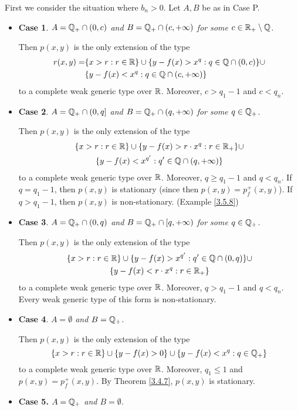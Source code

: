 \documentclass[11pt]{article}
\begin{document}
\begin{itemize}
First we consider the situation where \(b_n>0\). Let \(A,B\) be as in Case P.
\begin{itemize}
\item \textbf{Case 1}. \emph{\(A=\mathbb{Q}_+\cap(0,c)\) and \(B=\mathbb{Q}_+\cap(c,+\infty)\) for some \(c\in\mathbb{R}_+\setminus\mathbb{Q}\).}

Then \(p(x,y)\) is the only extension of the type
\begin{align*}
r(x,y)=&\{x>r:r\in\mathbb{R}\}\cup\{y-f(x)>x^q:q\in\mathbb{Q}\cap(0,c)\}\cup\\
&\{y-f(x)<x^q:q\in\mathbb{Q}\cap(c,+\infty)\}
\end{align*}
to a complete weak generic type over \(\mathbb{R}\). Moreover, \(c>q_1-1\) and \(c<q_n\).
\label{Problem8}
\item \textbf{Case 2}. \emph{\(A=\mathbb{Q}_+\cap(0,q]\) and \(B=\mathbb{Q}_+\cap(q,+\infty)\) for some \(q\in\mathbb{Q}_+\).}

Then \(p(x,y)\) is the only extension of the type
\begin{gather*}
\{x>r:r\in\mathbb{R}\}\cup\{y-f(x)>r\cdot x^q:r\in\mathbb{R}_+\}\cup\\
\{y-f(x)<x^{q'}:q'\in\mathbb{Q}\cap(q,+\infty)\}
\end{gather*}
to a complete weak generic type over \(\mathbb{R}\). Moreover, \(q\ge q_1-1\)
and \(q<q_n\).
If \(q=q_1-1\), then \(p(x,y)\) is stationary (since then \(p(x,y)=p_f^+(x,y)\)).
If \(q>q_1-1\), then \(p(x,y)\) is non-stationary. (Example \ref{3.5.8})
\item \textbf{Case 3}. \emph{\(A=\mathbb{Q}_+\cap(0,q)\) and \(B=\mathbb{Q}_+\cap[q,+\infty)\) for some \(q\in\mathbb{Q}_+\).}

Then \(p(x,y)\) is the only extension of the type
\begin{gather*}
\{x>r:r\in\mathbb{R}\}\cup\{y-f(x)>x^{q'}:q'\in\mathbb{Q}\cap(0,q)\}\cup\\
\{y-f(x)<r\cdot x^q:r\in\mathbb{R}_+\}
\end{gather*}
to a complete weak generic type over \(\mathbb{R}\). Moreover, \(q>q_1-1\) and \(q<q_n\). Every weak
generic type of this form is non-stationary.
\item \textbf{Case 4}. \emph{\(A=\emptyset\) and \(B=\mathbb{Q}_+\).}

Then \(p(x,y)\) is the only extension of the type
\begin{equation*}
\{x>r:r\in\mathbb{R}\}\cup\{y-f(x)>0\}\cup\{y-f(x)<x^q:q\in\mathbb{Q}_+\}
\end{equation*}
to a complete weak generic type over \(\mathbb{R}\). Moreover, \(q_1\le 1\) and \(p(x,y)=p_f^+(x,y)\). By
Theorem \ref{3.4.7}, \(p(x,y)\) is stationary.
\item \textbf{Case 5.} \emph{\(A=\mathbb{Q}_+\) and \(B=\emptyset\).}


\end{itemize}
\end{itemize}
\end{document}
